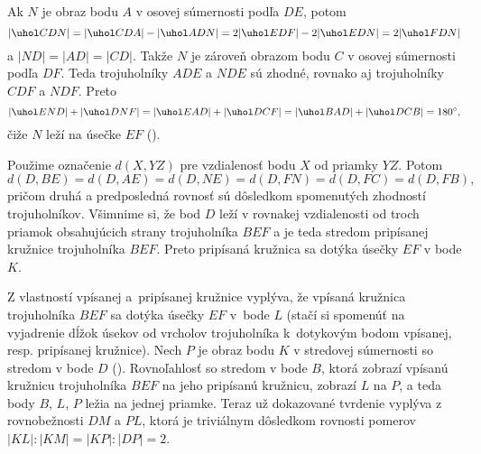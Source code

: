 {%
Ak $N$ je obraz bodu $A$ v osovej súmernosti podľa $DE$, potom
$$
|\uhol CDN| = |\uhol CDA| - |\uhol ADN| = 2 |\uhol EDF| - 2 |\uhol EDN| = 2 |\uhol FDN|
$$
a $|ND| = |AD| = |CD|$. Takže $N$ je zároveň obrazom bodu $C$ v osovej súmernosti podľa $DF$.
Teda trojuholníky $ADE$ a $NDE$ sú zhodné, rovnako aj trojuholníky $CDF$ a $NDF$. Preto
$$
|\uhol END| + |\uhol DNF| = |\uhol EAD| + |\uhol DCF| = |\uhol BAD| +|\uhol DCB| = 180^\circ,
$$
čiže $N$ leží na úsečke $EF$ (\obr).
%

Použime označenie $d(X, YZ)$ pre vzdialenosť bodu $X$ od priamky $YZ$. Potom
$$
d(D, BE) = d(D, AE) = d(D, NE) = d(D, FN) = d(D, FC) = d(D, FB),
$$
pričom druhá a predposledná rovnosť sú dôsledkom spomenutých zhodností trojuholníkov.
Všimnime si, že bod $D$ leží v rovnakej vzdialenosti od troch priamok obsahujúcich
strany trojuholníka $BEF$ a je teda stredom pripísanej kružnice trojuholníka $BEF$.
Preto pripísaná kružnica sa dotýka úsečky $EF$ v bode $K$.
%

Z vlastností vpísanej a~pripísanej kružnice vyplýva,
že vpísaná kružnica trojuholníka $BEF$ sa dotýka úsečky $EF$ v~bode $L$ (stačí si spomenúť na vyjadrenie dĺžok úsekov od vrcholov trojuholníka k~dotykovým bodom vpísanej, resp. pripísanej kružnice).
Nech $P$ je obraz bodu $K$ v stredovej súmernosti so stredom v bode $D$ (\obr).
Rovnoľahlosť so stredom v bode $B$,
ktorá zobrazí vpísanú kružnicu trojuholníka $BEF$
na jeho pripísanú kružnicu, zobrazí $L$ na $P$, a teda body $B$, $L$, $P$ ležia na jednej priamke.
Teraz už dokazované tvrdenie vyplýva z rovnobežnosti $DM$ a $PL$,
ktorá je triviálnym dôsledkom rovnosti pomerov $|KL|:|KM| = |KP|:|DP|=2$.
}

